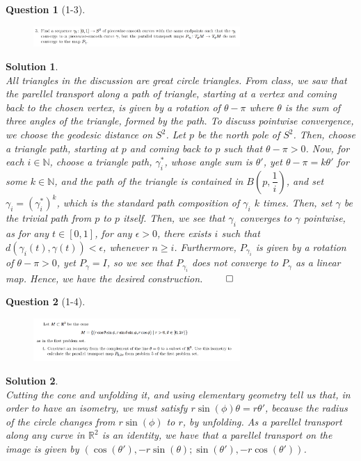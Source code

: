 \documentclass[11pt]{article}
\theoremstyle{plain}
\theoremstyle{quest}
\newtheorem*{question}{Question}
\newtheorem*{solution}{Solution}
\begin{document}
\newpage

\begin{question}[1-3]
\hfill
\begin{figure}[h!]
  \centering
    \includegraphics[width=0.7\textwidth]{geoII-s2-p3.png}
\end{figure}
\end{question}
\begin{solution} \hfill \\
All triangles in the discussion are great circle triangles.
From class, we saw that the parellel transport along a path of triangle, starting 
at a vertex and coming back to the chosen vertex, is given by a rotation of
$\theta - \pi$ where $\theta$ is the sum of three angles of the triangle, formed 
by the path. To discuss pointwise convergence, we choose the geodesic distance 
on $S^2$. Let $p$ be the north pole of $S^2$. Then, choose a triangle path, starting
at $p$ and coming back to $p$ such that $\theta - \pi > 0$. Now, for each $i \in 
\mathbb{N}$, choose a triangle path, $\gamma_{i}^{*}$, 
whose angle sum is $\theta'$, yet $\theta - \pi
= k \theta'$ for some $k \in \mathbb{N}$, and the path of the triangle is contained 
in $B(p,\dfrac{1}{i})$, and set $\gamma_i = (\gamma_i^*)^k$, which is the standard
path composition of $\gamma_i$ $k$ times.  Then, set $\gamma$
be the trivial path from $p$ to $p$ itself. Then, we see that $\gamma_i$ converges
to $\gamma$ pointwise, as for any $t \in [0,1]$, for any $\epsilon > 0$,
there exists $i$ such that $d(\gamma_i(t),\gamma(t)) < \epsilon$, whenever
$n \geq i$. Furthermore, $P_{\gamma_i}$ is given by a rotation of $\theta - \pi > 0$,
yet $P_{\gamma} = I$, so we see that $P_{\gamma_i}$ does not converge to $P_{\gamma}$
as a linear map. Hence, we have the desired construction. \hfill $\qed$ 
\end{solution}

\newpage

\begin{question}[1-4]
\hfill
\begin{figure}[h!]
  \centering
    \includegraphics[width=0.7\textwidth]{geoII-s2-p4.png}
\end{figure}
\end{question}
\begin{solution} \hfill \\
Cutting the cone and unfolding it, and using elementary geometry tell us that,
in order to have an isometry, we must satisfy $r\sin(\phi)\theta = r\theta'$,
because the radius of the circle changes from $r\sin(\phi)$ to $r$, by unfolding.
As a parellel transport along any curve in $\mathbb{R}^2$ is an identity, we have 
that a parellel transport on the image is given by $(\cos(\theta'),-r\sin(\theta);
\sin(\theta'), -r\cos(\theta'))$. 
 
\end{solution}
\end{document}
